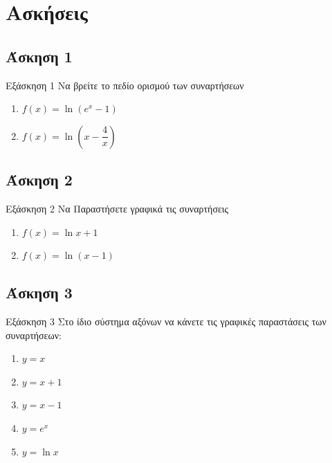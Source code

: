 \documentclass[greek]{beamer}
\begin{document}
\section{Ασκήσεις}
\subsection{Άσκηση 1}
\begin{frame}[label=Άσκηση1,t]{Εξάσκηση 1}
 Να βρείτε το πεδίο ορισμού των συναρτήσεων
 \begin{enumerate}
  \item<1-> $f(x)=\ln (e^x-1)$
  \item<2-> $f(x)=\ln \left( x-\dfrac{4}{x} \right) $
 \end{enumerate}

\end{frame}

\subsection{Άσκηση 2}
\begin{frame}[label=Άσκηση2,t]{Εξάσκηση 2}
 Να Παραστήσετε γραφικά τις συναρτήσεις
 \begin{enumerate}
  \item<1-> $f(x)=\ln x+1$
  \item<2-> $f(x)=\ln (x-1)$
 \end{enumerate}

\end{frame}

\subsection{Άσκηση 3}
\begin{frame}[label=Άσκηση3,t]{Εξάσκηση 3}
 Στο ίδιο σύστημα αξόνων να κάνετε τις γραφικές παραστάσεις των συναρτήσεων:
 \begin{enumerate}
  \item $y=x$
  \item $y=x+1$
  \item $y=x-1$
  \item $y=e^x$
  \item $y=\ln x$
 \end{enumerate}

\end{frame}
\end{document}
